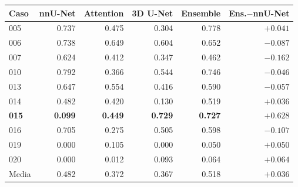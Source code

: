 \begin{tabular}{lrrrrr}
\toprule
Caso & nnU-Net & Attention & 3D U-Net & Ensemble & Ens.$-$nnU-Net \\
\midrule
005 & 0.737 & 0.475 & 0.304 & 0.778 & $+0.041$ \\
006 & 0.738 & 0.649 & 0.604 & 0.652 & $-0.087$ \\
007 & 0.624 & 0.412 & 0.347 & 0.462 & $-0.162$ \\
010 & 0.792 & 0.366 & 0.544 & 0.746 & $-0.046$ \\
013 & 0.647 & 0.554 & 0.416 & 0.590 & $-0.057$ \\
014 & 0.482 & 0.420 & 0.130 & 0.519 & $+0.036$ \\
\bfseries 015 & \bfseries 0.099 & \bfseries 0.449 & \bfseries 0.729 & \bfseries 0.727 & \bfseries $+0.628$ \\
016 & 0.705 & 0.275 & 0.505 & 0.598 & $-0.107$ \\
019 & 0.000 & 0.105 & 0.000 & 0.050 & $+0.050$ \\
020 & 0.000 & 0.012 & 0.093 & 0.064 & $+0.064$ \\
\midrule
Media & 0.482 & 0.372 & 0.367 & 0.518 & $+0.036$ \\
\bottomrule
\end{tabular}%